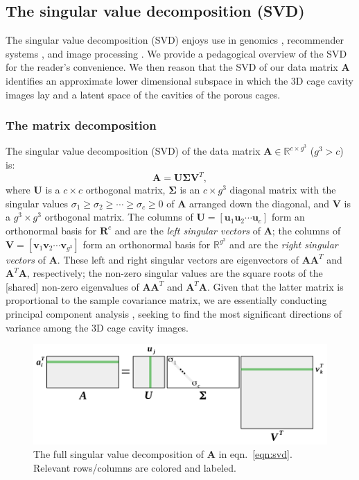 \documentclass[journal=jacsat,manuscript=article,layout=traditional]{achemso}
\begin{document}
\subsection{The singular value decomposition (SVD)}
The singular value decomposition (SVD) \cite{muller2004singular,kalman1996singularly,strang1993introduction} enjoys use in genomics \cite{alter2000singular}, recommender systems \cite{koren2008factorization}, and image processing \cite{muller2004singular}. {\color{red} We provide a pedagogical overview of the SVD for the reader's convenience.} We then reason that the SVD of our data matrix $\mathbf{A}$ identifies an approximate lower dimensional subspace in which the 3D cage cavity images lay and a latent space of the cavities of the porous cages.

\subsubsection{The matrix decomposition}
The singular value decomposition (SVD) of the data matrix $\mathbf{A} \in \mathbb{R} ^{c \times g^3}$ ($g^3 > c$) is:
\begin{equation}
\mathbf{A}=\mathbf{U} \mathbf{\Sigma} \mathbf{V}^T,
\label{eqn:svd}
\end{equation} where $\mathbf{U}$ is a $c \times c$ orthogonal matrix, $\mathbf{\Sigma}$ is an $c\times g^3$ diagonal matrix with the singular values 
$\sigma_1 \geq \sigma_2 \geq \cdots \geq \sigma_{c} \geq 0$ of $\mathbf{A}$ arranged down the diagonal, and $\mathbf{V}$ is a $g^3 \times g^3$ orthogonal matrix. The columns of $\mathbf{U} = [\mathbf{u}_1 \mathbf{u}_2 \cdots \mathbf{u}_c]$ form an orthonormal basis for $\mathbf{R}^c$ and are the \emph{left singular vectors} of $\mathbf{A}$; the columns of $\mathbf{V}=[\mathbf{v}_1 \mathbf{v}_2 \cdots \mathbf{v}_{g^3}]$ form an orthonormal basis for $\mathbb{R}^{g^3}$ and are the \emph{right singular vectors} of $\mathbf{A}$. These left and right singular vectors are eigenvectors of $\mathbf{A}\mathbf{A}^T$ and $\mathbf{A}^T\mathbf{A}$, respectively; the non-zero singular values are the square roots of the [shared] non-zero eigenvalues of $\mathbf{A}\mathbf{A}^T$ and $\mathbf{A}^T\mathbf{A}$. Given that the latter matrix is proportional to the sample covariance matrix, we are essentially conducting principal component analysis \cite{strang1993introduction}, seeking to find the most significant directions of variance among the 3D cage cavity images.

\begin{figure}
\centering
	\includegraphics[width=0.75\columnwidth]{svd-crop.pdf}
	\caption{The full singular value decomposition of $\mathbf{A}$ in eqn.~\ref{eqn:svd}. {\color{red} Relevant rows/columns are colored and labeled.}
	} \label{fig:svd}
\end{figure}
\end{document}
